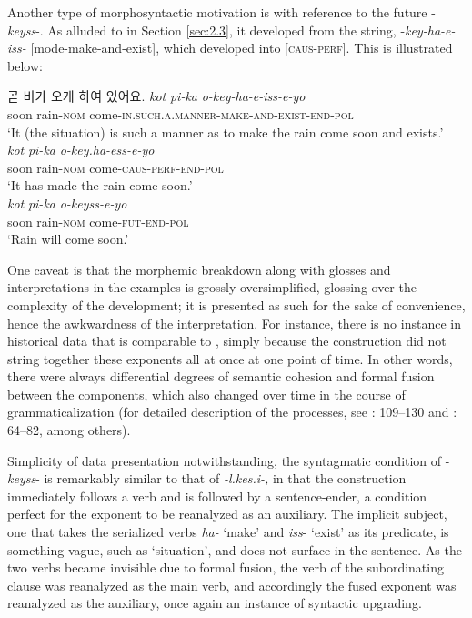 \documentclass[output=paper,colorlinks,citecolor=brown]{langscibook}
\begin{document}
Another type of morphosyntactic motivation is with reference to the future -\textit{keyss}-. As alluded to in Section \ref{sec:2.3}, it developed from the string, -\textit{key-ha-e-iss-} [mode-make-and-exist], which developed into [\textsc{caus-perf}]. This is illustrated below:

\ea \textkorean{곧 비가 오게 하여 있어요}. \label{ex:rhee:11}
    \ea \label{ex:rhee:11a}
    \gll \textit{kot} \textit{pi-ka} \textit{o-key-ha-e-iss-e-yo}\\
         soon rain-\textsc{nom} come-\textsc{in.such.a.manner-make-and-exist-end-pol}\\
    \glt ‘It (the situation) is such a manner as to make the rain come soon and exists.’\\

    \ex \label{ex:rhee:11b}
    \gll \textit{kot} \textit{pi-ka} \textit{o-key.ha-ess-e-yo}\\
         soon rain-\textsc{nom} come-\textsc{caus-perf-end-pol}\\
    \glt ‘It has made the rain come soon.’\\

    \ex \label{ex:rhee:11c}
    \gll \textit{kot} \textit{pi-ka} \textit{o-keyss-e-yo}\\
         soon rain-\textsc{nom} come-\textsc{fut-end-pol}\\
    \glt ‘Rain will come soon.’\\
    \z
\z

One caveat is that the morphemic breakdown along with glosses and interpretations in the examples is grossly oversimplified, glossing over the complexity of the development; it is presented as such for the sake of convenience, hence the awkwardness of the interpretation. For instance, there is no instance in historical data that is comparable to , simply because the construction did not string together these exponents all at once at one point of time. In other words, there were always differential degrees of semantic cohesion and formal fusion between the components, which also changed over time in the course of grammaticalization (for detailed description of the processes, see \cite{Rhee1996}: 109--130 and \cite{Lee1997}: 64--82, among others). 

Simplicity of data presentation notwithstanding, the syntagmatic condition of -\textit{keyss}- is remarkably similar to that of \textit{-l.kes.i-,} in that the construction immediately follows a verb and is followed by a sentence-ender, a condition perfect for the exponent to be reanalyzed as an auxiliary. The implicit subject, one that takes the serialized verbs \textit{ha-} ‘make’ and \textit{iss}- ‘exist’ as its predicate, is something vague, such as ‘situation’, and does not surface in the sentence. As the two verbs became invisible due to formal fusion, the verb of the subordinating clause was reanalyzed as the main verb, and accordingly the fused exponent was reanalyzed as the auxiliary, once again an instance of syntactic upgrading. 
\end{document}
